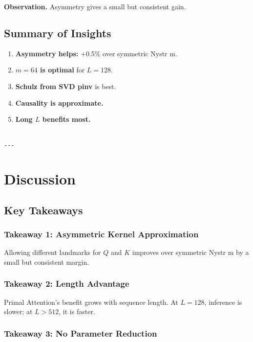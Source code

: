 \textbf{Observation.} Asymmetry gives a small but consistent gain.

\subsection{Summary of Insights}

\begin{enumerate}
\item \textbf{Asymmetry helps:} +0.5\% over symmetric Nystr m.
\item \textbf{$m = 64$ is optimal} for $L = 128$.
\item \textbf{Schulz from SVD pinv} is best.
\item \textbf{Causality is approximate.}
\item \textbf{Long $L$ benefits most.}
\end{enumerate}
\begin{lstlisting}

---
\end{lstlisting}


\section{Discussion}

\subsection{Key Takeaways}

\subsubsection{Takeaway 1: Asymmetric Kernel Approximation}

Allowing different landmarks for $Q$ and $K$ improves over symmetric Nystr m 
by a small but consistent margin.

\subsubsection{Takeaway 2: Length Advantage}

Primal Attention's benefit grows with sequence length. At $L = 128$, 
inference is slower; at $L > 512$, it is faster.

\subsubsection{Takeaway 3: No Parameter Reduction}

